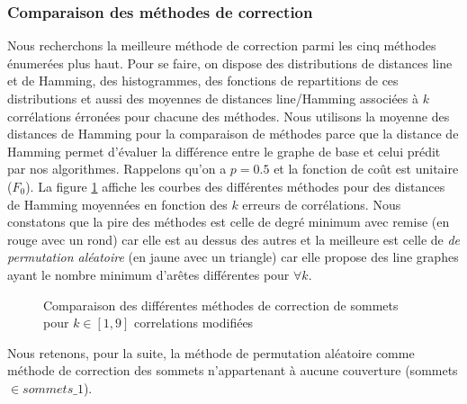 \subsubsection{Comparaison des m\'ethodes de correction}
Nous recherchons la meilleure m\'ethode de correction parmi les cinq m\'ethodes \'enumer\'ees plus haut. 
Pour se faire, on dispose des distributions de distances line et de Hamming, des histogrammes, des fonctions de repartitions de ces distributions et aussi des moyennes de distances line/Hamming associ\'ees \`a $k$ corr\'elations \'erron\'ees pour chacune des m\'ethodes.  
Nous utilisons la moyenne des distances de Hamming pour la comparaison de m\'ethodes parce que la distance de Hamming permet d'\'evaluer la diff\'erence entre le graphe de base et celui pr\'edit par nos algorithmes.\newline
Rappelons qu'on a $p=0.5$ et la fonction de co\^ut est unitaire ($F_0$).
La figure \ref{compareDifferentesMethodesCorrectionSommets_fct_cout_unitaire_p05} affiche les courbes  des diff\'erentes m\'ethodes pour des distances de Hamming moyenn\'ees en fonction des $k$ erreurs de corr\'elations.
\newline
Nous constatons  que la pire des m\'ethodes est celle de degr\'e minimum avec remise (en rouge avec un rond) car elle est au dessus des autres et la meilleure est celle de {\em de permutation al\'eatoire} (en jaune avec un triangle) car elle propose des line graphes ayant  le nombre minimum d'ar\^etes diff\'erentes pour $ \forall k$.\newline
\begin{centering} 
\begin{figure}[htb!] 
\caption{ Comparaison des diff\'erentes m\'ethodes de correction de sommets pour $k \in [1,9]$ correlations modifi\'ees }
\label{compareDifferentesMethodesCorrectionSommets_fct_cout_unitaire_p05} 
\end{figure}
\end{centering} 
Nous retenons, pour la suite, la m\'ethode de permutation al\'eatoire comme m\'ethode de correction des sommets n'appartenant \`a aucune couverture (sommets $\in sommets\_1$).
\newline


